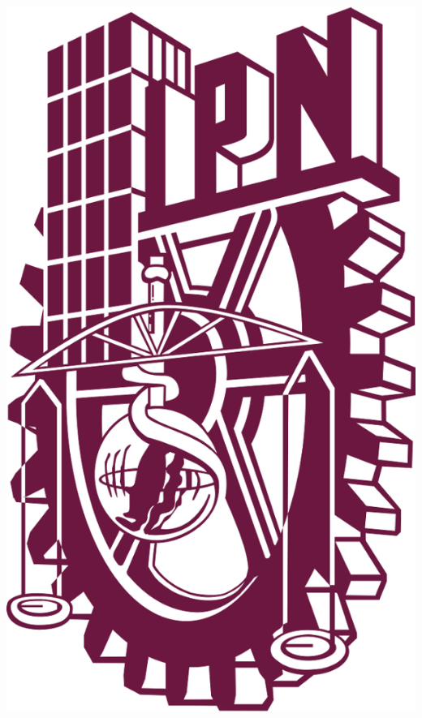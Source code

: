 \begin{center}
\newcommand{\HRule}{\rule{\linewidth}{0.5mm}}
\begin{minipage}{0.48\textwidth} \begin{flushleft}


\includegraphics[scale = 0.09]{images/ipn.png}
\end{flushleft}\end{minipage}
\begin{minipage}{0.48\textwidth} \begin{flushright}

\end{flushright}
\end{minipage}
\end{center}
